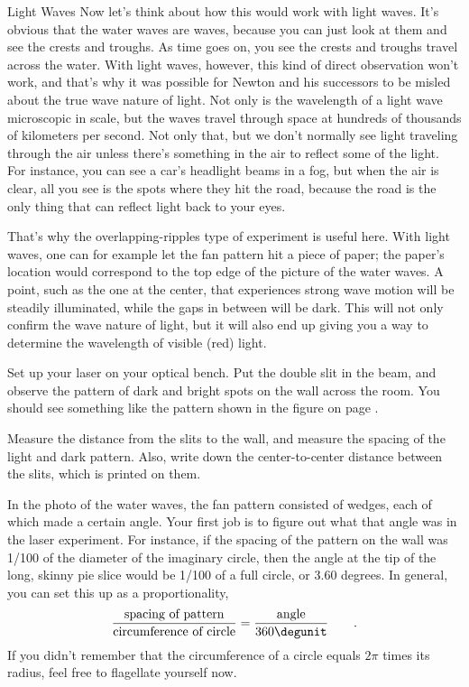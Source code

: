 \begin{lab}{Light Waves}
Now let's think about how this would work with light waves. It's obvious that the water
waves are waves, because you can just look at them and see the crests and troughs. As time
goes on, you see the crests and troughs travel across the water. With light waves, however,
this kind of direct observation won't work, and that's why it was possible for Newton
and his successors to be misled about the true wave nature of light. Not only is the
wavelength of a light wave microscopic in scale, but the waves travel through space
at hundreds of thousands of kilometers per second. Not only that, but we don't normally
see light traveling through the air unless there's something in the air to reflect some
of the light. For instance, you can see a car's headlight beams in a fog, but when the
air is clear, all you see is the spots where they hit the road, because the road is the
only thing that can reflect light back to your eyes.

That's why the overlapping-ripples type of experiment is useful here. With light waves, one
can for example let the fan pattern hit a piece of paper; the paper's location would
correspond to the top edge of the picture of the water waves. A point, such as the
one at the center, that experiences strong wave motion will be steadily illuminated,
while the gaps in between will be dark. This will not only confirm the wave nature of
light, but it will also end up giving you a way to determine the wavelength of visible
(red) light.

\labobservations

Set up your laser on your optical bench.
Put the double slit in the beam, and observe the pattern
of dark and bright spots on the wall across the room. You
should see something like the pattern shown in the figure on page \pageref{fig:fringes}.

\label{fig:fringes}

Measure the distance from the slits to the wall, and measure the spacing
of the light and dark pattern. Also, write down the center-to-center distance
between the slits, which is printed on them. 



In the photo of the water waves, the fan pattern consisted of wedges, each of
which made a certain angle. Your first job is to figure out what that angle
was in the laser experiment. For instance, if the spacing of the pattern on the
wall was 1/100 of the diameter of the imaginary circle, then the angle at the tip of
the long, skinny pie slice would be 1/100 of a full circle, or 3.60 degrees.
In general, you can set this up as a proportionality,
\begin{equation*}
\frac{\text{spacing of pattern}}{\text{circumference of circle}} = \frac{\text{angle}}{360\degunit} \qquad .
\end{equation*}
If you didn't remember that the circumference of a circle equals $2\pi$ times its radius, feel
free to flagellate yourself now.


\end{lab}
